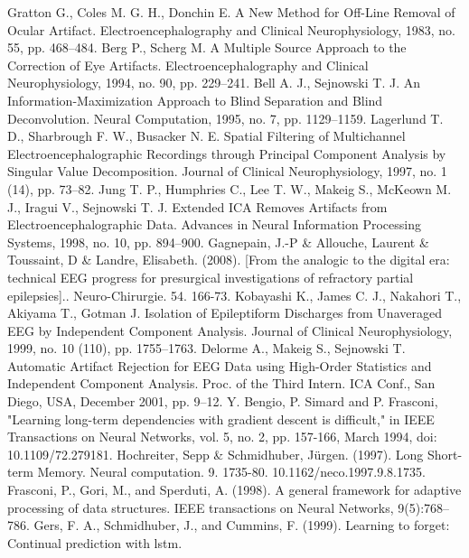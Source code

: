 \documentclass[12pt, a4paper, titlepage]{extreport}
\begin{document}
	\begin{thebibliography}{00}
			 Gratton G., Coles M. G. H., Donchin E. A New Method for Off-Line Removal of Ocular Artifact. Electroencephalography and Clinical Neurophysiology, 1983, no. 55, pp. 468–484.
			 Berg P., Scherg M. A Multiple Source Approach to the Correction of Eye Artifacts. Electroencephalography and Clinical Neurophysiology, 1994, no. 90, pp. 229–241.
			 Bell A. J., Sejnowski T. J. An Information-Maximization Approach to Blind Separation and Blind Deconvolution. Neural Computation, 1995, no. 7, pp. 1129–1159.
			 Lagerlund T. D., Sharbrough F. W., Busacker N. E. Spatial Filtering of Multichannel Electroencephalographic Recordings through Principal Component Analysis by Singular Value Decomposition. Journal of Clinical Neurophysiology, 1997, no. 1 (14), pp. 73–82.
			 Jung T. P., Humphries C., Lee T. W., Makeig S., McKeown M. J., Iragui V., Sejnowski T. J. Extended ICA Removes Artifacts from Electroencephalographic Data.
			 Advances in Neural Information Processing Systems, 1998, no. 10, pp. 894–900.
			 Gagnepain, J.-P \& Allouche, Laurent \& Toussaint, D \& Landre, Elisabeth. (2008). [From the analogic to the digital era: technical EEG progress for presurgical investigations of refractory partial epilepsies].. Neuro-Chirurgie. 54. 166-73. 
			 Kobayashi K., James C. J., Nakahori T., Akiyama T., Gotman J. Isolation of Epileptiform Discharges from Unaveraged EEG by Independent Component Analysis. Journal of Clinical Neurophysiology, 1999, no. 10 (110), pp. 1755–1763.
			 Delorme A., Makeig S., Sejnowski T. Automatic Artifact Rejection for EEG Data using High-Order Statistics and Independent Component Analysis. Proc. of the Third Intern. ICA Conf., San Diego, USA, December 2001, pp. 9–12.
			 Y. Bengio, P. Simard and P. Frasconi, "Learning long-term dependencies with gradient descent is difficult," in IEEE Transactions on Neural Networks, vol. 5, no. 2, pp. 157-166, March 1994, doi: 10.1109/72.279181.
			 Hochreiter, Sepp \& Schmidhuber, Jürgen. (1997). Long Short-term Memory. Neural computation. 9. 1735-80. 10.1162/neco.1997.9.8.1735. 
			Frasconi, P., Gori, M., and Sperduti, A. (1998). A general
			framework for adaptive processing of data structures.
			IEEE transactions on Neural Networks, 9(5):768–
			786.
			Gers, F. A., Schmidhuber, J., and Cummins, F. (1999).
			Learning to forget: Continual prediction with lstm.

\end{thebibliography}
\end{document}
